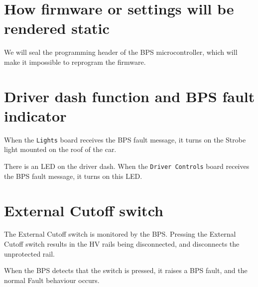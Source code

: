 \documentclass[10pt]{article}
\begin{document}
\section{How firmware or settings will be rendered static}

We will seal the programming header of the BPS microcontroller, which will
make it impossible to reprogram the firmware.

\section{Driver dash function and BPS fault indicator}

When the \texttt{Lights} board receives the BPS fault message, it turns on the
Strobe light mounted on the roof of the car.

There is an LED on the driver dash. When the \texttt{Driver Controls} board
receives the BPS fault message, it turns on this LED.

\section{External Cutoff switch}

The External Cutoff switch is monitored by the BPS. Pressing the External
Cutoff switch results in the HV rails being disconnected, and disconnects the
unprotected rail.

When the BPS detects that the switch is pressed, it raises a BPS fault, and
the normal Fault behaviour occurs.




\pagebreak
\appendix
\end{document}
